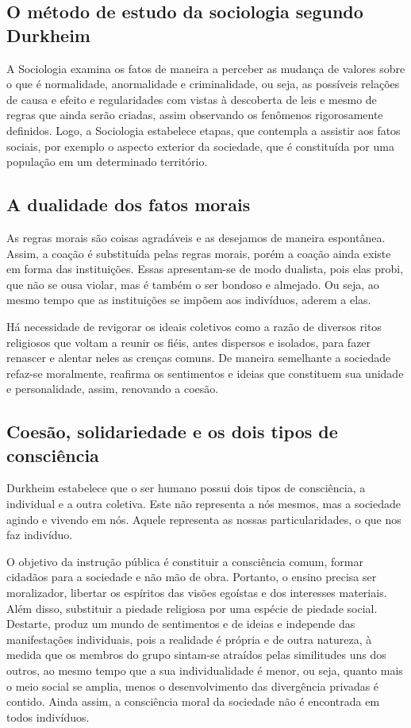 \subsection{O método de estudo da sociologia segundo Durkheim}

A Sociologia examina os fatos de maneira a perceber as mudança de valores sobre o que é normalidade, anormalidade e criminalidade, ou seja, as possíveis relações de causa e efeito e regularidades com vistas à descoberta de leis e mesmo de regras que ainda serão criadas, assim observando os fenômenos rigorosamente definidos. 
Logo, a Sociologia estabelece etapas, que contempla a assistir aos fatos sociais, por exemplo o aspecto exterior da sociedade, que é constituída por uma população em um determinado território.


\subsection{A dualidade dos fatos morais}

As regras morais são coisas agradáveis e as desejamos de maneira espontânea.
Assim, a coação é substituída pelas regras morais, porém a coação ainda existe em forma das instituições.
Essas apresentam-se de modo dualista, pois elas probi, que não se ousa violar, mas é também o ser bondoso e almejado. 
Ou seja,  ao mesmo tempo que as instituições se impõem aos indivíduos, aderem a elas.

Há necessidade de revigorar os ideais coletivos como a razão de diversos ritos religiosos que voltam a reunir os fiéis, antes dispersos e isolados, para fazer renascer e alentar neles as crenças comuns.
De maneira semelhante a sociedade  refaz-se moralmente, reafirma os sentimentos e ideias que constituem sua unidade e personalidade, assim, renovando a coesão.


\subsection{Coesão, solidariedade e os dois tipos de consciência}

Durkheim estabelece que o ser humano possui dois tipos de consciência, a individual e a outra coletiva. 
Este não representa a nós mesmos, mas a sociedade agindo e vivendo em nós. 
Aquele representa as nossas particularidades, o que nos faz indivíduo.

O objetivo da instrução pública é constituir a consciência comum, formar cidadãos para a sociedade e não mão de obra. 
Portanto, o ensino precisa ser moralizador, libertar os espíritos das visões egoístas e dos interesses materiais.
Além disso, substituir a piedade religiosa por uma espécie de piedade social.
Destarte, produz um mundo de sentimentos e de ideias e independe das manifestações individuais, pois a realidade é própria e de outra natureza, à medida que os membros do grupo sintam-se atraídos pelas similitudes uns dos outros, ao mesmo tempo que a sua individualidade é menor, ou seja, quanto mais o meio social se amplia, menos o desenvolvimento das divergência privadas é contido. 
Ainda assim, a consciência moral da sociedade não é encontrada em todos indivíduos.


